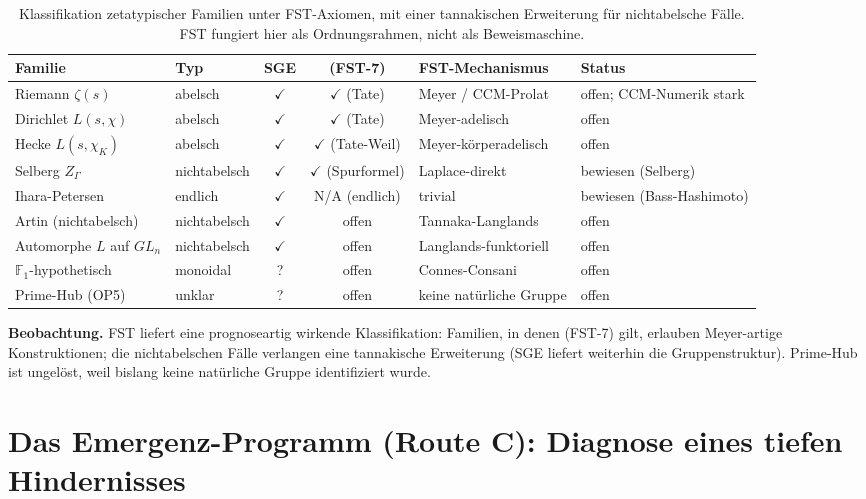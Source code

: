 \documentclass[11pt,a4paper]{article}
\theoremstyle{plain}
\theoremstyle{definition}
\newcommand{\F}{\mathbb{F}}
\newcommand{\chifn}{\chi}
\begin{document}
\begin{table}[h]
\centering
\small
\begin{tabular}{@{}L{0.16\textwidth}L{0.14\textwidth}ccL{0.22\textwidth}L{0.20\textwidth}@{}}
\toprule
\textbf{Familie} & \textbf{Typ} & \textbf{SGE} & \textbf{(FST-7)} & \textbf{FST-Mechanismus} & \textbf{Status} \\
\midrule
Riemann $\zeta(s)$ & abelsch & $\checkmark$ & $\checkmark$ (Tate) & Meyer / CCM-Prolat & offen; CCM-Numerik stark \\
Dirichlet $L(s, \chifn)$ & abelsch & $\checkmark$ & $\checkmark$ (Tate) & Meyer-adelisch & offen \\
Hecke $L(s, \chifn_K)$ & abelsch & $\checkmark$ & $\checkmark$ (Tate-Weil) & Meyer-körperadelisch & offen \\
Selberg $Z_\Gamma$ & nichtabelsch & $\checkmark$ & $\checkmark$ (Spurformel) & Laplace-direkt & bewiesen (Selberg) \\
Ihara-Petersen & endlich & $\checkmark$ & N/A (endlich) & trivial & bewiesen (Bass-Hashimoto) \\
Artin (nichtabelsch) & nichtabelsch & $\checkmark$ & offen & Tannaka-Langlands & offen \\
Automorphe $L$ auf $GL_n$ & nichtabelsch & $\checkmark$ & offen & Langlands-funktoriell & offen \\
$\F_1$-hypothetisch & monoidal & ? & offen & Connes-Consani & offen \\
Prime-Hub (OP5) & unklar & ? & offen & keine natürliche Gruppe & offen \\
\bottomrule
\end{tabular}
\caption{Klassifikation zetatypischer Familien unter FST-Axiomen,
mit einer tannakischen Erweiterung für nichtabelsche Fälle. FST fungiert
hier als Ordnungsrahmen, nicht als Beweismaschine.}
\label{tab:classification-v2}
\end{table}

\textbf{Beobachtung.} FST liefert eine prognoseartig wirkende Klassifikation:
Familien, in denen (FST-7) gilt, erlauben Meyer-artige Konstruktionen; die
nichtabelschen Fälle verlangen eine tannakische Erweiterung (SGE liefert
weiterhin die Gruppenstruktur). Prime-Hub ist ungelöst, weil bislang keine
natürliche Gruppe identifiziert wurde.

\section{Das Emergenz-Programm (Route C): Diagnose eines tiefen Hindernisses}
\label{sec:emergence}
\end{document}
